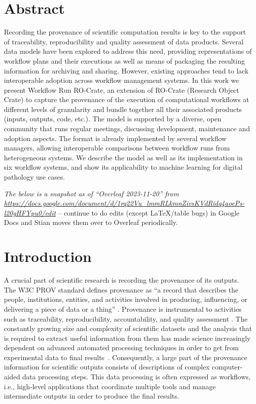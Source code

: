 \documentclass[10pt,letterpaper]{article}
\begin{document}
\section*{Abstract}
Recording the provenance of scientific computation results is key to the support of traceability, reproducibility and quality assessment of data products. 
Several data models have been explored to address this need, providing representations of workflow plans and their executions as well as means of packaging the resulting information for archiving and sharing. 
However, existing approaches tend to lack interoperable adoption across workflow management systems. 
In this work we present Workflow Run RO-Crate, an extension of RO-Crate (Research Object Crate) to capture the provenance of the execution of computational workflows at different levels of granularity and bundle together all their associated products (inputs, outputs, code, etc.). 
The model is supported by a diverse, open community that runs regular meetings, discussing development, maintenance and adoption aspects. 
The format is already implemented by several workflow managers, allowing interoperable comparisons between workflow runs from heterogeneous systems. 
We describe the model as well as its implementation in six workflow systems, and show its applicability to machine learning for digital pathology use cases.


\linenumbers



\emph{The below is a snapshot as of ``Overleaf 2023-11-20'' from
\url{https://docs.google.com/document/d/1rq22Vu_lmmRLkmnZivsKVdRidq4aoePs-l20gHFYpu0/edit}} -- continue to do edits (except LaTeX/table bugs) in Google Docs and Stian moves them over to Overleaf periodically.

\section{Introduction}\label{introduction}

A crucial part of scientific research is recording the provenance of its outputs.
The W3C PROV standard defines provenance as ``a record that describes the people, institutions, entities, and activities involved in producing, influencing, or delivering a piece of data or a thing''
\cite{Moreau 2013}.
Provenance is instrumental to activities such as traceability, reproducibility, accountability, and quality assessment
\cite{Herschel 2017}.
The constantly growing size and complexity of scientific datasets and the analysis that is required to extract useful information from them has made science increasingly dependent on advanced automated processing techniques in order to get from experimental data to final results~\cite{Himanen 2019, Gauthier 2019, Huntingford 2019}.
Consequently, a large part of the provenance information for scientific outputs consists of descriptions of complex computer-aided data processing steps. This data processing is often expressed as workflows, i.e., high-level applications that coordinate multiple tools and manage intermediate outputs in order to produce the final results.
\end{document}
